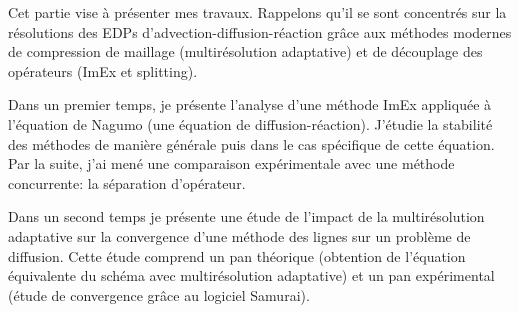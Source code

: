 Cet partie vise à présenter mes travaux. Rappelons qu'il se sont concentrés sur la résolutions des EDPs d'advection-diffusion-réaction grâce
aux méthodes modernes de compression de maillage (multirésolution adaptative) et de découplage des opérateurs (ImEx et splitting).\par
Dans un premier temps, je présente l'analyse d'une méthode ImEx appliquée à l'équation de Nagumo (une équation de diffusion-réaction).
J'étudie la stabilité des méthodes de manière générale puis dans le cas spécifique de cette équation. Par la suite, j'ai mené une comparaison expérimentale
avec une méthode concurrente: la séparation d'opérateur.\par
Dans un second temps je présente une étude de l'impact de la multirésolution adaptative sur la convergence d'une méthode des lignes sur un problème de diffusion.
Cette étude comprend un pan théorique (obtention de l'équation équivalente du schéma avec multirésolution adaptative) 
et un pan expérimental (étude de convergence grâce au logiciel Samurai).